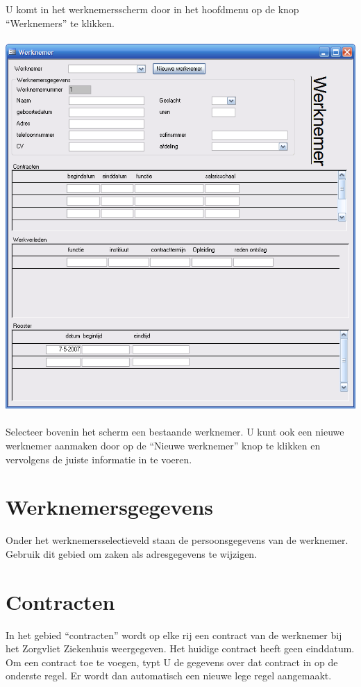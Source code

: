 U komt in het werknemersscherm door in het hoofdmenu op de knop ``Werknemers''
te klikken.\\
\\
\includegraphics[scale=.5]{werknemer2} \\
\\
Selecteer bovenin het scherm een bestaande werknemer. U kunt ook een nieuwe werknemer aanmaken door op de ``Nieuwe
werknemer'' knop te klikken en vervolgens de juiste informatie in te voeren.

\section{Werknemersgegevens} \label{sec:werknemersgegevens}
    Onder het werknemersselectieveld staan de persoonsgegevens
    van de werknemer. Gebruik dit gebied om zaken als adresgegevens
    te wijzigen.


\section{Contracten} \label{sec:contracten}
    In het gebied ``contracten'' wordt op elke rij een contract
    van de werknemer bij het Zorgvliet Ziekenhuis weergegeven. Het
    huidige contract heeft geen einddatum. Om een contract toe te voegen, typt U de gegevens over dat
    contract in op de onderste regel. Er wordt dan automatisch een nieuwe lege regel aangemaakt.

